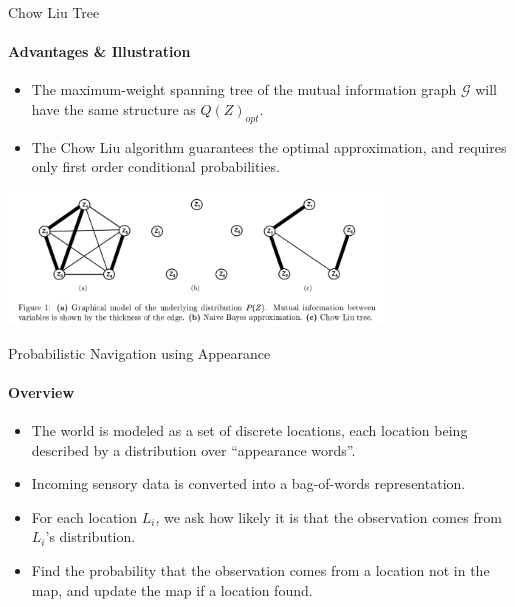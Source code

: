 \documentclass[dvipsnames, handout]{beamer}
\newcommand{\1}{\mathds{1}}	%
\begin{document}
\begin{frame}[t]{Chow Liu Tree}
\framesubtitle{Advantages \& Illustration}
\begin{itemize}
\item The maximum-weight spanning tree of the mutual information graph $\mathcal{G}$ will have the same structure as $Q(Z)_{opt}$.
\item The Chow Liu algorithm guarantees the optimal approximation, and requires only first order conditional probabilities.
\end{itemize}

\begin{center}
\includegraphics[width=0.75\textwidth]{imgs/fig1.png}
\end{center}
\end{frame}

\begin{frame}[t]{Probabilistic Navigation using Appearance}
\framesubtitle{Overview}
\begin{itemize}
\item The world is modeled as a set of discrete locations, each location being described by a distribution over ``appearance words''.
\item Incoming sensory data is converted into a bag-of-words representation.
\item For each location $L_i$, we ask how likely it is that the observation comes from $L_i$'s distribution.
\item Find the probability that the observation comes from a location not in the map, and update the map if a location found.
\end{itemize}
\end{frame}
\end{document}
